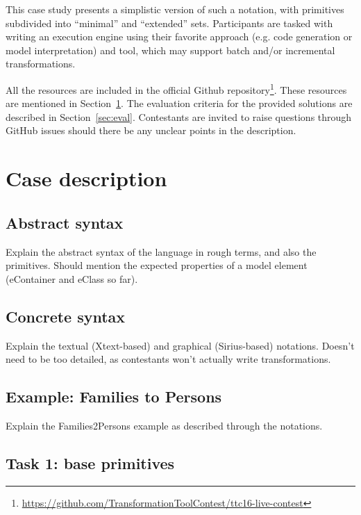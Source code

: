 \documentclass[a4paper]{scrartcl}
\begin{document}
This case study presents a simplistic version of such a notation, with
primitives subdivided into ``minimal'' and ``extended''
sets. Participants are tasked with writing an execution engine using
their favorite approach (e.g. code generation or model interpretation)
and tool, which may support batch and/or incremental transformations.

All the resources are included in the official Github
repository\footnote{\url{https://github.com/TransformationToolContest/ttc16-live-contest}}. These
resources are mentioned in Section~\ref{sec:case}. The evaluation
criteria for the provided solutions are described in
Section~\ref{sec:eval}. Contestants are invited to raise questions
through GitHub issues should there be any unclear points in the
description.

\section{Case description}
\label{sec:case}

\subsection{Abstract syntax}
\label{sec:asyn}

Explain the abstract syntax of the language in rough terms, and also
the primitives. Should mention the expected properties of a model
element (eContainer and eClass so far).

\subsection{Concrete syntax}
\label{sec:csyn}

Explain the textual (Xtext-based) and graphical (Sirius-based)
notations. Doesn't need to be too detailed, as contestants won't
actually write transformations.

\subsection{Example: Families to Persons}
\label{sec:f2p}

Explain the Families2Persons example as described through the
notations.

\subsection{Task 1: base primitives}
\label{sec:baseprim}
\end{document}
